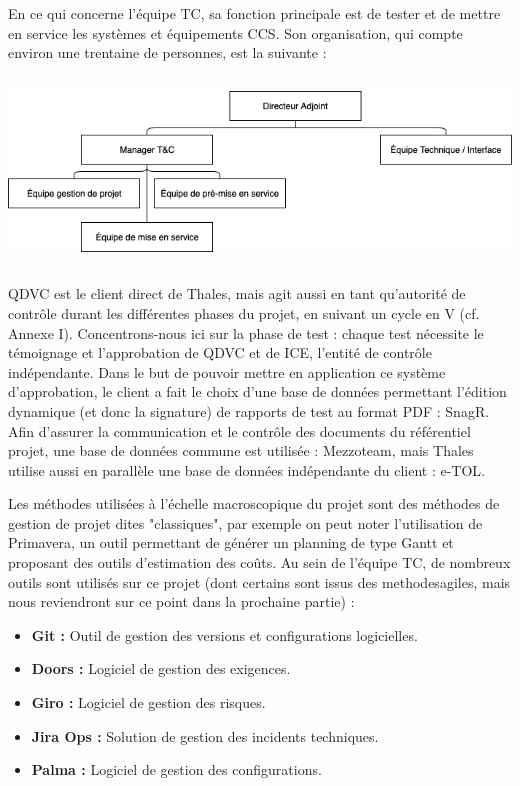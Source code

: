 En ce qui concerne l'équipe \gls{TC}, sa fonction principale est de tester et de mettre en service les systèmes et équipements \gls{CCS}.
Son organisation, qui compte environ une trentaine de personnes, est la suivante :

\begin{center}
\includegraphics[height=5cm]{ressources/images/figures/OBS2.png}
\end{center}

QDVC est le client direct de Thales, mais agit aussi en tant qu'autorité de contrôle durant les différentes phases du projet, en suivant un cycle en V (cf. Annexe I). Concentrons-nous ici sur la phase de test : chaque test nécessite le témoignage et l'approbation de QDVC et de ICE, l'entité de contrôle indépendante.
Dans le but de pouvoir mettre en application ce système d'approbation, le client a fait le choix d'une base de données permettant l'édition dynamique (et donc la signature) de rapports de test au format PDF : \gls{SnagR}.
Afin d'assurer la communication et le contrôle des documents du référentiel projet, une base de données commune est utilisée : \gls{Mezzoteam}, mais Thales utilise aussi en parallèle une  base de données indépendante du client : \gls{e-TOL}.

Les méthodes utilisées à l'échelle macroscopique du projet sont des méthodes de gestion de projet dites "classiques", par exemple on peut noter l'utilisation de Primavera, un outil permettant de générer un planning de type Gantt et proposant des outils d'estimation des coûts.
Au sein de l'équipe \gls{TC}, de nombreux outils sont utilisés sur ce projet (dont certains sont issus des \gls{methodesagiles}, mais nous reviendront sur ce point dans la prochaine partie) :
\begin{itemize}
\item \textbf{\gls{Git} :} Outil de gestion des versions et configurations logicielles.
\item \textbf{Doors :} Logiciel de gestion des exigences.
\item \textbf{Giro :} Logiciel de gestion des risques.
\item \textbf{Jira Ops :} Solution de gestion des incidents techniques.
\item \textbf{Palma :} Logiciel de gestion des configurations.
\end{itemize}

